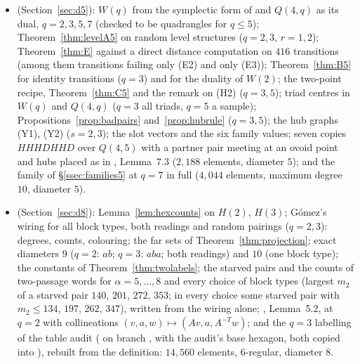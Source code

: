 \documentclass[11pt]{amsart}
\theoremstyle{definition}
\theoremstyle{remark}
\begin{document}
\begin{itemize}[leftmargin=1.5em]
\item {} (Section~\ref{sec:d5}): $W(q)$ from the symplectic form of  and $Q(4,q)$ as its dual, $q=2,3,5,7$ (checked to be quadrangles for $q\le5$); Theorem~\ref{thm:levelA5} on random level structures ($q=2,3$, $r=1,2$); Theorem~\ref{thm:E} against a direct distance computation on $416$ transitions (among them transitions failing only (E2) and only (E3)); Theorem~\ref{thm:B5} for identity transitions ($q=3$) and for the duality of $W(2)$; the two-point recipe, Theorem~\ref{thm:C5} and the remark on (H2) ($q=3,5$); triad centres in $W(q)$ and $Q(4,q)$ ($q=3$ all triads, $q=5$ a sample); Propositions~\ref{prop:badpairs} and~\ref{prop:hubrule} ($q=3,5$); the hub graphs (Y1), (Y2) ($s=2,3$); the slot vectors and the six family values; seven copies $HHHDHHD$ over $Q(4,5)$ with a partner pair meeting at an ovoid point and hubs placed as in , Lemma~7.3 ($2{,}188$ elements, diameter $5$); and the family of \S\ref{ssec:families5} at $q=7$ in full ($4{,}044$ elements, maximum degree $10$, diameter $5$).
\item {} (Section~\ref{sec:d8}): Lemma~\ref{lem:hexcounts} on $H(2)$, $H(3)$; G\'omez's wiring for all block types, both readings and random pairings ($q=2,3$): degrees, counts, colouring; the far sets of Theorem~\ref{thm:projection}; exact diameters $9$ ($q=2$: $ab$; $q=3$: $aba$; both readings) and $10$ (one block type); the constants of Theorem~\ref{thm:twolabels}; the starved pairs and the counts of two-passage words for $\alpha=5,\dots,8$ and every choice of block types (largest $m_2$ of a starved pair $140$, $201$, $272$, $353$; in every choice some starved pair with $m_2\le134$, $197$, $262$, $347$), written from the wiring alone; , Lemma~5.2, at $q=2$ with collineations $(v,a,w)\mapsto(Av,a,A^{-T}w)$; and the $q=3$ labelling of the table audit ( on branch , with the audit's base hexagon, both copied into ), rebuilt from the definition: $14{,}560$ elements, $6$-regular, diameter $8$.

\end{itemize}
\end{document}
